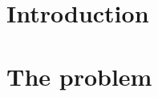 \documentclass[a4paper]{article}
\author{Lu\'is M. S. Russo\\
  \texttt{luis.russo@tecnico.ulisboa.pt}
  \and
  Daniel Castro\\
 \texttt{daniel.castro@ist.utl.pt}
  \and
  Aleksandar Ilic\\
  \texttt{aleksandar.ilic@inesc-id.pt}
  \and
  Paolo Romano\\
  \texttt{romano@inesc-id.pt}
}
\title{}
\date{}
\begin{document}
\maketitle

\begin{abstract}

\end{abstract}
%

\section{Introduction}
\label{sec:introduction}

\section{The problem}
\label{sec:problem}
\end{document}
